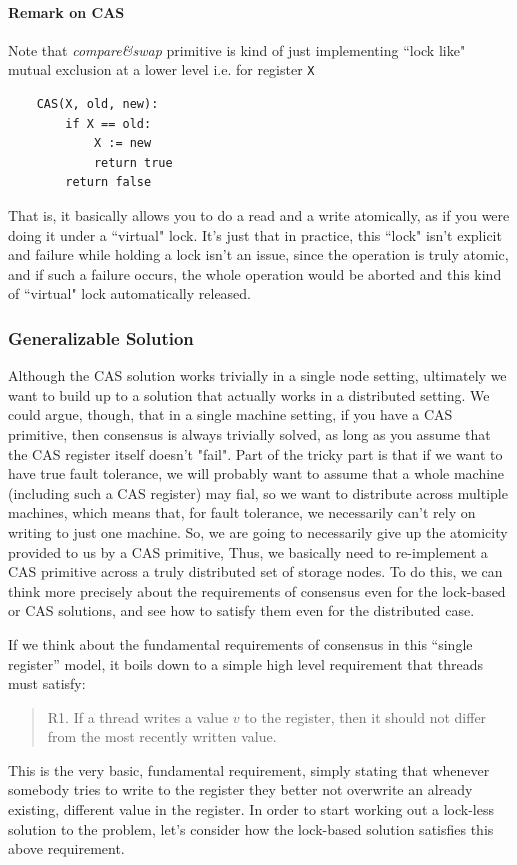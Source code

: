 \documentclass[10pt,a4paper]{article}
\begin{document}
\paragraph{Remark on CAS}
Note that \textit{compare\&swap} primitive is kind of just implementing ``lock like" mutual exclusion at a lower level i.e. for register \verb|X|
\begin{verbatim}
    CAS(X, old, new):
        if X == old:
            X := new
            return true
        return false
\end{verbatim}
That is, it basically allows you to do a read and a write atomically, as if you were doing it under a ``virtual" lock. It's just that in practice, this ``lock" isn't explicit and failure while holding a lock isn't an issue, since the operation is truly atomic, and if such a failure occurs, the whole operation would be aborted and this kind of ``virtual" lock automatically released.

\subsubsection{Generalizable Solution}

Although the CAS solution works trivially in a single node setting, ultimately we want to build up to a solution that actually works in a distributed setting. We could argue, though, that in a single machine setting, if you have a CAS primitive, then consensus is always trivially solved, as long as you assume that the CAS register itself doesn't "fail". Part of the tricky part is that if we want to have true fault tolerance, we will probably want to assume that a whole machine (including such a CAS register) may fial, so we want to distribute across multiple machines, which means that, for fault tolerance, we necessarily can't rely on writing to just one machine. So, we are going to necessarily give up the atomicity provided to us by a CAS primitive, Thus, we basically need to re-implement a CAS primitive across a truly distributed set of storage nodes. To do this, we can think more precisely about the requirements of consensus even for the lock-based or CAS solutions, and see how to satisfy them even for the distributed case.

If we think about the fundamental requirements of consensus in this ``single register'' model, it boils down to a simple high level requirement that threads must satisfy:
\begin{quote}
    R1. If a thread writes a value $v$ to the register, then it should not differ from the most recently written value.
\end{quote}
This is the very basic, fundamental requirement, simply stating that whenever somebody tries to write to the register they better not overwrite an already existing, different value in the register. In order to start working out a lock-less solution to the problem, let's consider how the lock-based solution satisfies this above requirement.
\end{document}
